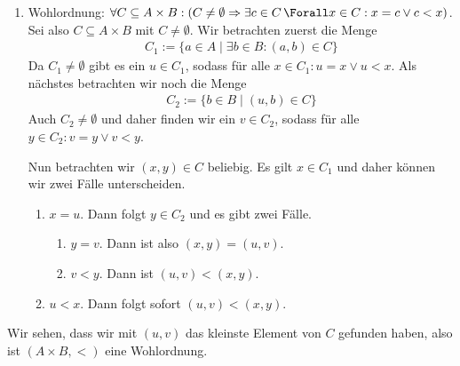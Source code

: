 \begin{solution}
\begin{enumerate}
		\item Wohlordnung: $\forall C \subseteq A \times B: (C \neq \emptyset \Rightarrow \exists c \in C\, \Forall x \in C: x = c \lor c < x)$. Sei also $C \subseteq A \times B$ mit $C \neq \emptyset$. Wir betrachten zuerst die Menge
			\begin{align*}
				C_1 := \{a \in A \mid \exists b \in B: (a,b) \in C\}
			\end{align*}
		Da $C_1 \neq \emptyset$ gibt es ein $u \in C_1$, sodass für alle $x \in C_1: u = x \lor u < x$. Als nächstes betrachten wir noch die Menge
			\begin{align*}
				C_2 := \{b \in B \mid (u, b) \in C\}
			\end{align*}
		Auch $C_2 \neq \emptyset$ und daher finden wir ein $v \in C_2$, sodass für alle $y \in C_2: v = y \lor v < y$.

		Nun betrachten wir $(x,y) \in C$ beliebig. Es gilt $x \in C_1$ und daher können wir zwei Fälle unterscheiden.
		\begin{enumerate}[label = Fall \arabic*:]
			\item $x = u$. Dann folgt $y \in C_2$ und es gibt zwei Fälle.
				\begin{enumerate}[label = Fall 1.\arabic*]
					\item $y = v$. Dann ist also $(x,y) = (u,v)$.
					\item $v < y$. Dann ist $(u,v) < (x,y)$.
				\end{enumerate}

			\item $u < x$. Dann folgt sofort $(u,v) < (x,y)$.
		\end{enumerate}
	\end{enumerate}

	Wir sehen, dass wir mit $(u,v)$ das kleinste Element von $C$ gefunden haben, also ist $(A \times B, <)$ eine Wohlordnung.

\end{solution}
